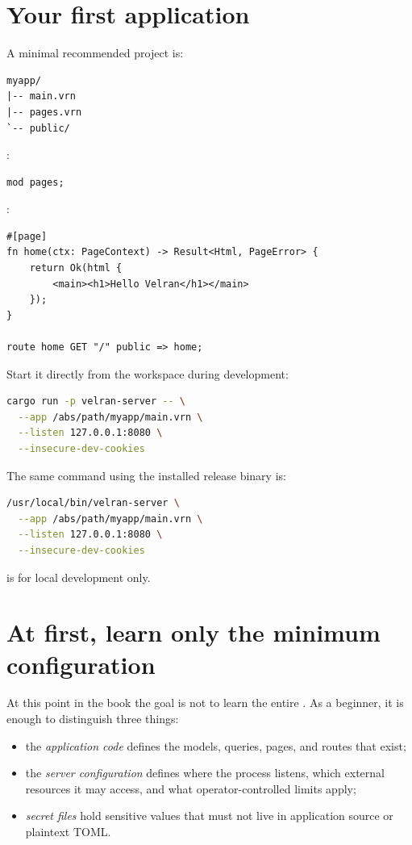 \section{Your first application}

A minimal recommended project is:

\begin{lstlisting}
myapp/
|-- main.vrn
|-- pages.vrn
`-- public/
\end{lstlisting}

:

\begin{lstlisting}[language=Velran]
mod pages;
\end{lstlisting}

:

\begin{lstlisting}[language=Velran]
#[page]
fn home(ctx: PageContext) -> Result<Html, PageError> {
    return Ok(html {
        <main><h1>Hello Velran</h1></main>
    });
}

route home GET "/" public => home;
\end{lstlisting}

Start it directly from the workspace during development:

\begin{lstlisting}[language=bash]
cargo run -p velran-server -- \
  --app /abs/path/myapp/main.vrn \
  --listen 127.0.0.1:8080 \
  --insecure-dev-cookies
\end{lstlisting}

The same command using the installed release binary is:

\begin{lstlisting}[language=bash]
/usr/local/bin/velran-server \
  --app /abs/path/myapp/main.vrn \
  --listen 127.0.0.1:8080 \
  --insecure-dev-cookies
\end{lstlisting}

\code{--insecure-dev-cookies} is for local development only.

\section{At first, learn only the minimum configuration}

At this point in the book the goal is not to learn the entire . As a beginner, it is enough to distinguish three things:

\begin{itemize}
  \item the \emph{application code} defines the models, queries, pages, and routes that exist;
  \item the \emph{server configuration} defines where the process listens, which external resources it may access, and what operator-controlled limits apply;
  \item \emph{secret files} hold sensitive values that must not live in application source or plaintext TOML.
\end{itemize}

